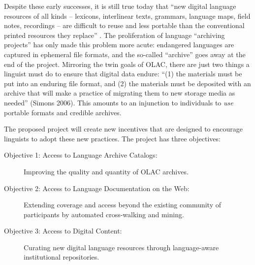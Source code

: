 
Despite these early successes, it is still true today that ``new
digital language resources of all kinds -- lexicons, interlinear
texts, grammars, language maps, field notes, recordings -- are
difficult to reuse and less portable than the conventional printed
resources they replace'' \citep{BirdSimons03language}.  The proliferation of
language ``archiving projects'' has only made this problem more
acute: endangered languages are captured in ephemeral file formats,
and the so-called ``archive'' goes away at the end of the project.
Mirroring the twin goals of OLAC, there are just two things a linguist
must do to ensure that digital data endure: ``(1) the materials must be
put into an enduring file format, and (2) the materials must be
deposited with an archive that will make a practice of migrating them
to new storage media as needed'' (Simons 2006).  This amounts to an
injunction to individuals to \emph{use} portable formats and credible
archives.

The proposed project will create new incentives that are designed to
encourage linguists to adopt these new practices.  The project has
three objectives:

\begin{description}
  \item[Objective 1: Access to Language Archive Catalogs:]
    Improving the quality and quantity of OLAC archives.

  \item[Objective 2: Access to Language Documentation on the Web:]
    Extending coverage and access beyond the existing community of
    participants by automated cross-walking and mining.

  \item[Objective 3: Access to Digital Content:]
    Curating new digital language resources through
    language-aware institutional repositories.
\end{description}


